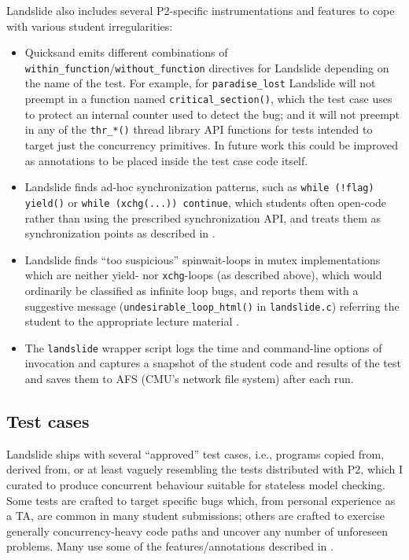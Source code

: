\noindent Landslide also includes several P2-specific instrumentations and features to cope with various student irregularities:
\begin{itemize}
	\item Quicksand emits different combinations of {\tt within\_function}/{\tt without\_function} directives
		for Landslide depending on the name of the test.
		For example, for {\tt paradise\_\allowbreak{}lost} Landslide will not preempt in a function named {\tt critical\_section()},
		which the test case uses to protect an internal counter used to detect the bug;
		and it will not preempt in any of the {\tt thr\_*()} thread library API functions
		for tests intended to target just the concurrency primitives.
		In future work this could be improved as annotations to be placed inside the test case code itself.
	\item Landslide finds ad-hoc synchronization patterns,
		such as {\tt while (!flag) yield()} or {\tt while (xchg(...)) continue},
		which students often open-code rather than using the prescribed synchronization API,
		and treats them as synchronization points as described in \sect{\ref{sec:landslide-blocking}}.
	\item Landslide finds ``too suspicious'' spinwait-loops in mutex implementations
		which are neither yield- nor {\tt xchg}-loops (as described above),
		which would ordinarily be classified as infinite loop bugs,
		and reports them with a suggestive message ({\tt undesirable\_\allowbreak{}loop\_html()} in {\tt landslide.c})
		referring the student to the appropriate lecture material
		\cite{synchronization-2}.
	\item The {\tt landslide} wrapper script logs the time and command-line options of invocation
		and captures a snapshot of the student code and results of the test and saves them to AFS
		(CMU's network file system)
		after each run.
\end{itemize}

\subsection{Test cases}
\label{sec:education-pebbles-tests}

Landslide ships with several ``approved'' test cases,
i.e., programs copied from, derived from, or at least vaguely resembling
the tests distributed with P2,
which I curated to produce concurrent behaviour suitable for stateless model checking.
Some tests are crafted to target specific bugs which,
from personal experience as a TA, are common in many student submissions;
others are crafted to exercise generally concurrency-heavy code paths and uncover any number of unforeseen problems.
Many use some of the features/annotations described in \sect{\ref{sec:landslide-testcases}}.


